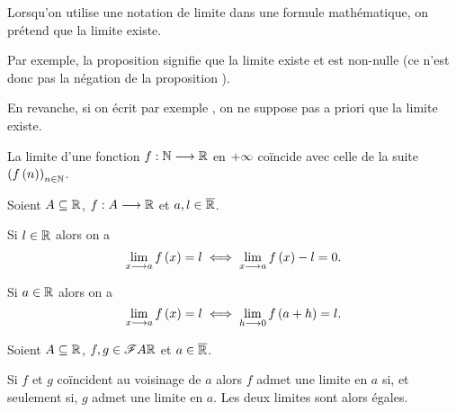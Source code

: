 \begin{rem}
Lorsqu'on utilise une notation de limite dans une formule mathématique, on prétend que la limite existe.

Par exemple, la proposition  signifie que la limite existe et est non-nulle (ce n'est donc pas la négation de la proposition ).

En revanche, si on écrit par exemple , on ne suppose pas a priori que la limite existe.
\end{rem}

\begin{rem}
La limite d'une fonction \(f:\mathbb{N}\longrightarrow\mathbb{R}\) en \(+\infty\) coïncide avec celle de la suite \(\left(f\left(n\right)\right)_{n\in\mathbb{N}}\).
\end{rem}

\begin{rem}
Soient \(A\subseteq\mathbb{R}\), \(f:A\longrightarrow\mathbb{R}\) et \(a,l\in\overline{\mathbb{R}}\).

Si \(l\in\mathbb{R}\) alors on a \[\lim_{x\longrightarrow a}f\left(x\right)=l\iff\lim_{x\longrightarrow a}f\left(x\right)-l=0.\]

Si \(a\in\mathbb{R}\) alors on a \[\lim_{x\longrightarrow a}f\left(x\right)=l\iff\lim_{h\longrightarrow0}f\left(a+h\right)=l.\]
\end{rem}

\begin{rem}
Soient \(A\subseteq\mathbb{R}\), \(f,g\in\mathscr{F}{A}{\mathbb{R}}\) et \(a\in\overline{\mathbb{R}}\).

Si \(f\) et \(g\) coïncident au voisinage de \(a\) alors \(f\) admet une limite en \(a\) si, et seulement si, \(g\) admet une limite en \(a\). Les deux limites sont alors égales.
\end{rem}

